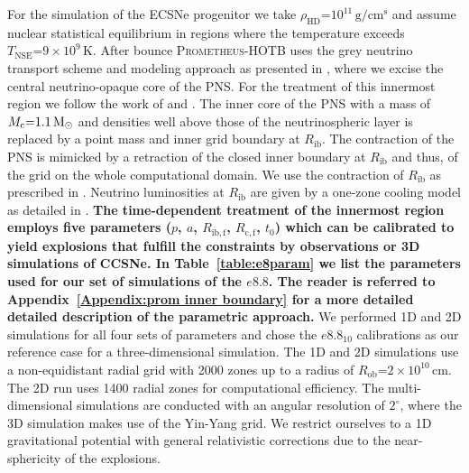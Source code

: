 \documentclass[fleqn,usenatbib]{mnras}
\newcommand{\solm}{\ensuremath{\rm{M_{\odot}}}\xspace}
\newcommand{\prom}{\textsc{Prometheus-HOTB}\xspace}
\begin{document}
For the simulation of the ECSNe progenitor we take $\rho_{\mathrm{HD}}\mathord{=}10^{11}\,\mathrm{g/cm^s}$ and assume nuclear statistical equilibrium in regions where the temperature exceeds $T_{\mathrm{NSE}}\mathord{=}9\times10^9\,\mathrm{K}$.
After bounce \prom uses the grey neutrino transport scheme and modeling approach as presented in \cite{Scheck2006}, where we excise the central neutrino-opaque core of the PNS. For the treatment of this innermost region we follow the work of \cite{Ugliano2012} and \cite{Sukhbold2016}. 
The inner core of the PNS with a mass of $M_{\mathrm{c}}\mathord{=}1.1\,\solm$ and densities well above those of the neutrinospheric layer is replaced by a point mass and inner grid boundary at $R_{\mathrm{ib}}$. The contraction of the PNS is mimicked by a retraction of the closed inner boundary at $R_{\mathrm{ib}}$ and thus, of the grid on the whole computational domain. We use the contraction of $R_{\mathrm{ib}}$ as prescribed in \cite{Ertl2016}.
Neutrino luminosities at $R_{\mathrm{ib}}$ are given by a one-zone cooling model as detailed in \cite{Ugliano2012}.
\textbf{The time-dependent treatment of the innermost region employs five parameters ($p$, $a$, $R_{\mathrm{ib,f}}$, $R_{\mathrm{c,f}}$, $t_{0}$) which can be calibrated to yield explosions that fulfill the constraints by observations or 3D simulations of CCSNe.
In Table~\ref{table:e8param} we list the parameters used for our set of simulations of the $e8.8$. The reader is referred to Appendix~\ref{Appendix:prom inner boundary} for a more detailed detailed description of the parametric approach.}
We performed 1D and 2D simulations for all four sets of parameters and chose the $e8.8_{10}$ calibrations as our reference case for a three-dimensional simulation. The 1D and 2D simulations use a non-equidistant radial grid with 2000 zones up to a radius of $R_{\mathrm{ob}}\mathord{=}2\times 10^{10}\,\text{cm}$. 
The 2D run uses 1400 radial zones for computational efficiency. 
The multi-dimensional simulations are conducted with an angular resolution of $2^{\circ}$, where the 3D simulation makes use of the Yin-Yang grid.
We restrict ourselves to a 1D gravitational potential with general relativistic corrections due to the near-sphericity of the explosions.
\end{document}
